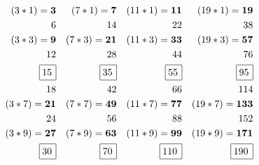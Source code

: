 \documentclass[12pt, letterpaper, twosided]{report}
\begin{document}
\begin{align*}
& &(3*1)=\bf{3}   & &(7*1)=\bf{7}   & &(11*1)=\bf{11}   & &(19*1)=\bf{19}   & &\\
& &6   & &14 & &22   & &38   & &\\
& &(3*3)=\bf{9}   & &(7*3)=\bf{21} & &(11*3)=\bf{33}   & &(19*3)=\bf{57}   & &\\
& &12 & &28 & &44   & &76   & &\\
& &{\renewcommand{\arraystretch}{1.25}
\renewcommand{\tabcolsep}{0.1cm}\begin{tabular}{|p{0.4cm}|}
\hline
15 \\
\hline
\end{tabular}} & &{\renewcommand{\arraystretch}{1.25}
\renewcommand{\tabcolsep}{0.1cm}\begin{tabular}{|p{0.4cm}|}
\hline
35 \\
\hline
\end{tabular}} & &{\renewcommand{\arraystretch}{1.25}
\renewcommand{\tabcolsep}{0.1cm}\begin{tabular}{|p{0.4cm}|}
\hline
55 \\
\hline
\end{tabular}}   & &{\renewcommand{\arraystretch}{1.25}
\renewcommand{\tabcolsep}{0.1cm}\begin{tabular}{|p{0.4cm}|}
\hline
95 \\
\hline
\end{tabular}}   & &\\
& &18 & &42 & &66   & &114 & &\\
& &(3*7)=\bf{21} & &(7*7)=\bf{49} & &(11*7)=\bf{77}   & &(19*7)=\bf{133} & &\\
& &24 & &56 & &88   & &152 & &\\
& &(3*9)=\bf{27} & &(7*9)=\bf{63} & &(11*9)=\bf{99}   & &(19*9)=\bf{171} & &\\
& &{\renewcommand{\arraystretch}{1.25}
\renewcommand{\tabcolsep}{0.1cm}\begin{tabular}{|p{0.4cm}|}
\hline
30 \\
\hline
\end{tabular}} & &{\renewcommand{\arraystretch}{1.25}
\renewcommand{\tabcolsep}{0.1cm}\begin{tabular}{|p{0.4cm}|}
\hline
70 \\
\hline
\end{tabular}} & &{\renewcommand{\arraystretch}{1.25}
\renewcommand{\tabcolsep}{0.1cm}\begin{tabular}{|p{0.6cm}|}
\hline
110 \\
\hline
\end{tabular}} & &{\renewcommand{\arraystretch}{1.25}
\renewcommand{\tabcolsep}{0.1cm}\begin{tabular}{|p{0.6cm}|}
\hline
190 \\
\hline
\end{tabular}}
\end{align*}
\end{document}
